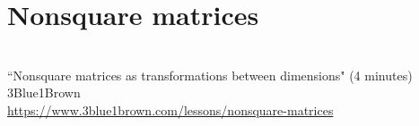 \section{Nonsquare matrices}
\begin{bookfigure}
   \\
  ``Nonsquare matrices as transformations between dimensions" (4 minutes) \\
  \footnotesize 3Blue1Brown \\
  \url{https://www.3blue1brown.com/lessons/nonsquare-matrices}
\end{bookfigure}
